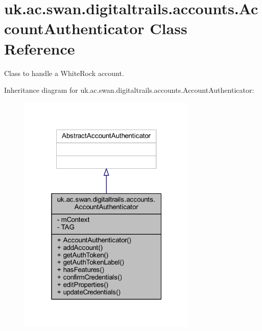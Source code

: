 \hypertarget{classuk_1_1ac_1_1swan_1_1digitaltrails_1_1accounts_1_1_account_authenticator}{\section{uk.\+ac.\+swan.\+digitaltrails.\+accounts.\+Account\+Authenticator Class Reference}
\label{classuk_1_1ac_1_1swan_1_1digitaltrails_1_1accounts_1_1_account_authenticator}
}


Class to handle a White\+Rock account.  




Inheritance diagram for uk.\+ac.\+swan.\+digitaltrails.\+accounts.\+Account\+Authenticator\+:
\nopagebreak
\begin{figure}[H]
\begin{center}
\leavevmode
\includegraphics[width=241pt]{classuk_1_1ac_1_1swan_1_1digitaltrails_1_1accounts_1_1_account_authenticator__inherit__graph}
\end{center}
\end{figure}


